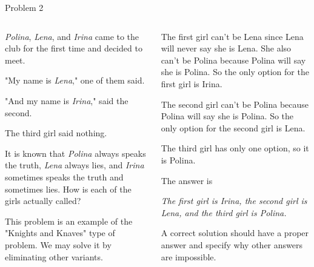 \documentclass[9pt,aspectratio=169]{beamer}
\begin{document}
\begin{frame}{Problem 2}
  \begin{columns}[T]
    \begin{column}{0.5\textwidth}
      \begin{problem}
        \emph{Polina}, \emph{Lena}, and \emph{Irina} came to the club for the first time and decided to meet.\smallskip

        "My name is \emph{Lena}," one of them said.\smallskip

        "And my name is \emph{Irina}," said the second.\smallskip

        The third girl said nothing.\smallskip

        It is known that \emph{Polina} always speaks the truth, \emph{Lena} always lies, and \emph{Irina} sometimes speaks the truth and sometimes lies. How is each of the girls actually called?
      \end{problem}

      This problem is an example of the "Knights and Knaves" type of problem. We may solve it by eliminating other variants.
    \end{column}
    \begin{column}{0.5\textwidth}
      The first girl can't be Lena since Lena will never say she is Lena. She also can't be Polina because Polina will say she is Polina. So the only option for the first girl is Irina.\medskip

      The second girl can't be Polina because Polina will say she is Polina. So the only option for the second girl is Lena.\medskip

      The third girl has only one option, so it is Polina.\medskip

      The answer is 

      \emph{The first girl is Irina, the second girl is Lena, and the third girl is Polina.}\medskip

      A correct solution should have a proper answer and specify why other answers are impossible.
    \end{column}
  \end{columns}
\end{frame}
\end{document}
